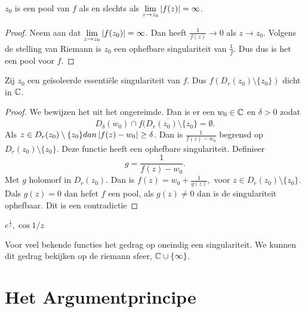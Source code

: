 \begin{gevolg}
	$z_0$ is een pool van $f$ als en slechts als $\lim_{z \to z_0} \abs{f(z)} = \infty$.
\end{gevolg}
\begin{proof}
	Neem aan dat $\lim_{z \to z_0}\abs{f(z_0)} = \infty$. 
	Dan heeft $\frac{1}{f(z)} \to 0 $ als $z \to z_0$. 
	Volgens de stelling van Riemann is $z_0$ een ophefbare singulariteit van $\frac{1}{f}$. Dus dus is het een pool voor $f$. 
\end{proof}
\begin{stelling}
	Zij $z_0$ een ge\"isoleerde essenti\"ele singulariteit van $f$. 
	Dus $f(D_r(z_0) \setminus \{z_0\}) $ dicht in $\mathbb{C}$. 
\end{stelling}
\begin{proof}
	We bewijzen het uit het ongereimde. 
	Dan is er een $w_0 \in \mathbb{C}$ en $\delta > 0$ zodat 
	\[
		D_\delta(w_0) \cap \overline{f(D_r(z_0) \setminus \{z_0\} } = \emptyset
	.\] 
	Als $z \in D_r(z_0) \setminus \{ z_0\} dan \left| f(z) - w_0 \right| \ge \delta$. 
	Dan is $\frac{1}{f(z)-w_0}$ begrensd op $D_r(z_0) \setminus \{z_0\} $. 
	Deze functie heeft een ophefbare singulariteit. 
	Definieer \[
		g = \frac{1}{f(z) - w_0}
	.\] 
	Met $g$ holomorf in $D_r(z_0)$. Dan is $f(z) = w_0 + \frac{1}{g(z)},$ voor $z \in D_r(z_0) \setminus \{z_0\} $. 
	Dals $g(z) = 0$ dan hefet $f $ een pool, als $g(z) \ne 0$ dan is de singulariteit ophefbaar. 
	Dit is een contradictie \contra
\end{proof}
\begin{vb}
	$e^{\frac{1}{z}}, \cos 1/z$	
\end{vb}
Voor veel bekende functies het gedrag op oneindig een singulariteit. We kunnen dit gedrag bekijken op de riemann sfeer, $\mathbb{C} \cup \{\infty\} $. 
\section{Het Argumentprincipe} \label{sec:het_argumentprincipe}

